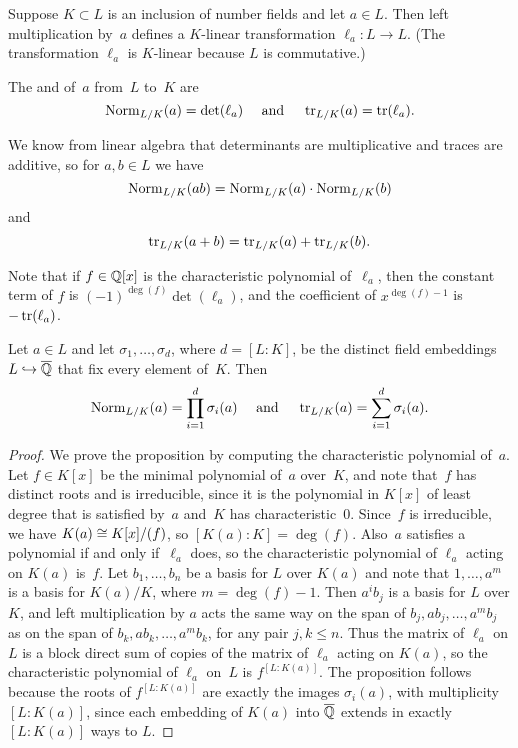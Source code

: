 Suppose $K\subset L$ is an inclusion of number fields and let $a\in
L$.  Then left multiplication by~$a$ defines a $K$-linear
transformation $\ell_a:L\to L$.  (The transformation $\ell_a$ is
$K$-linear because $L$ is commutative.)

\begin{definition}\label{defn:normtrace}
	The  and  of~$a$ from~$L$ to~$K$ are
	$$
		\operatorname{Norm}_{L/K}(a)=\det(\ell_a)
		\quad\text{ and }\quad
		\operatorname{tr}_{L/K}(a)=\operatorname{tr}(\ell_a).
	$$
\end{definition}
We know from linear algebra that
determinants are multiplicative
and traces are additive, so for $a,b\in L$ we have
$$\operatorname{Norm}_{L/K}(ab) = \operatorname{Norm}_{L/K}(a)\cdot \operatorname{Norm}_{L/K}(b)$$
and
$$\operatorname{tr}_{L/K}(a+b) = \operatorname{tr}_{L/K}(a) + \operatorname{tr}_{L/K}(b).$$

Note that if $f\in\mathbb{Q}[x]$ is the characteristic polynomial of~$\ell_a$,
then the constant term of $f$ is $(-1)^{\deg(f)}\det(\ell_a)$, and the
coefficient of $x^{\deg(f)-1}$ is $-\operatorname{tr}(\ell_a)$.

\begin{proposition}\label{prop:normtracesigma}
	Let $a\in L$ and let $\sigma_1,\ldots, \sigma_d$, where $d=[L:K]$, be
	the distinct field embeddings $L\hookrightarrow \overline{\mathbb{Q}}$ that fix every element
	of~$K$.  Then
	$$
		\operatorname{Norm}_{L/K}(a) = \prod_{i=1}^d \sigma_i(a)
		\quad\text{ and }\quad
		\operatorname{tr}_{L/K}(a) = \sum_{i=1}^d \sigma_i(a).
	$$
\end{proposition}
\begin{proof}
	We prove the proposition by computing the characteristic
	polynomial of~$a$.  Let $f\in K[x]$ be the minimal polynomial
	of~$a$ over~$K$, and note that~$f$ has distinct roots and is
	irreducible, since it is the polynomial in $K[x]$ of least degree
	that is satisfied by~$a$ and~$K$ has characteristic~$0$.  Since~$f$
	is irreducible, we have $K(a) \cong K[x]/(f)$, so $[K(a):K]=\deg(f)$.
	Also~$a$ satisfies a polynomial if and only if~$\ell_a$ does, so the
	characteristic polynomial of $\ell_a$ acting on $K(a)$ is~$f$.  Let
	$b_1,\ldots,b_n$ be a basis for $L$ over $K(a)$ and note that
	$1,\ldots, a^m$ is a basis for $K(a)/K$, where $m=\deg(f)-1$.  Then
	$a^i b_j$ is a basis for $L$ over $K$, and left multiplication by
	$a$ acts the same way on the span of $b_j, a b_j, \ldots, a^m b_j$
	as on the span of $b_k, a b_k, \ldots, a^m b_k$, for any pair $j,
	k\leq n$.  Thus the matrix of $\ell_a$ on $L$ is a block direct sum
	of copies of the matrix of $\ell_a$ acting on $K(a)$, so the
	characteristic polynomial of $\ell_a$ on~$L$ is $f^{[L:K(a)]}$.  The
	proposition follows because the roots of $f^{[L:K(a)]}$ are exactly
	the images $\sigma_i(a)$, with multiplicity $[L:K(a)]$, since each
	embedding of $K(a)$ into $\overline{\mathbb{Q}}$ extends in exactly $[L:K(a)]$ ways
	to $L$.
\end{proof}

